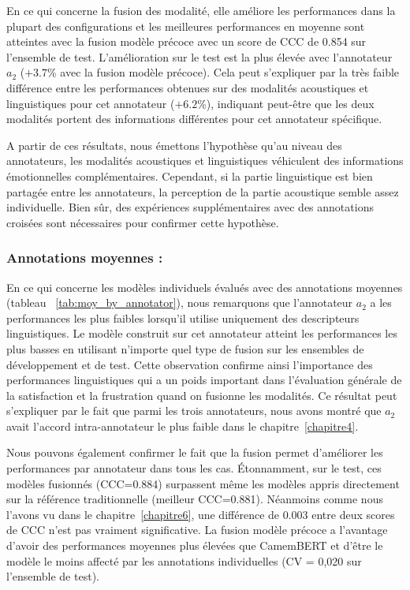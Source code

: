 En ce qui concerne la fusion des modalité, elle améliore les performances dans la plupart des configurations et les meilleures performances en moyenne sont atteintes avec la fusion modèle précoce avec un score de CCC de 0.854 sur l'ensemble de test. L'amélioration sur le test est la plus élevée avec l'annotateur $a_2$ ($+3.7$\% avec la fusion modèle précoce).
Cela peut s'expliquer par la très faible différence entre les performances obtenues sur des modalités acoustiques et linguistiques pour cet annotateur ($+6.2$\%), indiquant peut-être que les deux modalités portent des informations différentes pour cet annotateur spécifique.

A partir de ces résultats, nous émettons l'hypothèse qu'au niveau des annotateurs, les modalités acoustiques et linguistiques véhiculent des informations émotionnelles complémentaires. Cependant, si la partie linguistique est bien partagée entre les annotateurs, la perception de la partie acoustique semble assez individuelle.
Bien sûr, des expériences supplémentaires avec des annotations croisées sont nécessaires pour confirmer cette hypothèse.

\subsubsection{Annotations moyennes : }



En ce qui concerne les modèles individuels évalués avec des annotations moyennes (tableau ~\ref{tab:moy_by_annotator}), nous remarquons que l'annotateur $a_2$ a les performances les plus faibles lorsqu'il utilise uniquement des descripteurs linguistiques.
Le modèle construit sur cet annotateur atteint les performances les plus basses en utilisant n'importe quel type de fusion sur les ensembles de développement et de test.
Cette observation confirme ainsi l'importance des performances linguistiques qui a un poids important dans l'évaluation générale de la satisfaction et la frustration quand on fusionne les modalités.
Ce résultat peut s'expliquer par le fait que parmi les trois annotateurs, nous avons montré que $a_2$ avait l'accord intra-annotateur le plus faible dans le chapitre~\ref{chapitre4}.

Nous pouvons également confirmer le fait que la fusion permet d'améliorer les performances par annotateur dans tous les cas.
Étonnamment, sur le test, ces modèles fusionnés (CCC=0.884) surpassent même les modèles appris directement sur la référence traditionnelle (meilleur CCC=0.881). Néanmoins comme nous l'avons vu dans le chapitre~\ref{chapitre6}, une différence de 0.003 entre deux scores de CCC n'est pas vraiment significative.
La fusion modèle précoce a l'avantage d'avoir des performances moyennes plus élevées que CamemBERT et d'être le modèle le moins affecté par les annotations individuelles (CV = 0,020 sur l'ensemble de test).

